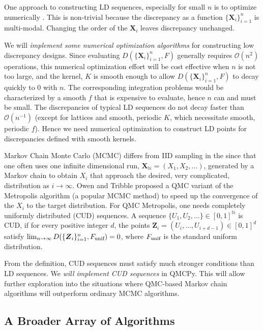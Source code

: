 \documentclass[11pt]{NSFamsart}
\newcommand{\unif}{\textup{unif}}
\newcommand{\naturals}{{\mathbb{N}}}
\newcommand{\bX}{{\boldsymbol{X}}}
\newcommand{\bZ}{{\boldsymbol{Z}}}
\newcommand{\Order}{\mathcal{O}}
\begin{document}
One approach to constructing LD sequences, especially for small $n$ is to optimize numerically \cite{WinFan97a,LiKanHic20a}.  This is non-trivial because the discrepancy as a function $\{ \bX_i\}_{i=1}^n$ is multi-modal.  Changing the order of the $\bX_i$ leaves discrepancy unchanged.  

We will \emph{implement some numerical optimization algorithms} for constructing low discrepancy designs.  Since evaluating  $D(\{ \bX_i\}_{i=1}^n,F)$ generally requires $\Order(n^2)$ operations, this numerical optimization effort will be cost effective when $n$ is not too large, and the kernel, $K$ is smooth enough to allow $D(\{ \bX_i\}_{i=1}^n,F)$  to decay quickly to $0$ with $n$.  The corresponding integration problems would be characterized by a smooth $f$ that is expensive to evaluate, hence  $n$ can and must be small.  The discrepancies of typical LD sequences do not decay faster than $\Order(n^{-1})$ (except for lattices and smooth, periodic $K$, which necessitate smooth, periodic $f$).  Hence we need numerical optimization to construct LD points  for discrepancies defined with smooth kernels.

Markov Chain Monte Carlo (MCMC) differs from IID sampling in the since that one often uses one infinite dimensional run, $\bX_{\naturals} = (X_1, X_2, \dots)$, generated by a Markov chain to obtain $X_i$ that approach the desired, very complicated, distribution as $i \to \infty$.  Owen and Tribble \cite{OweTri05a} proposed a QMC variant of the Metropolis algorithm (a popular MCMC method) to speed up the convergence of the $X_i$ to the target distribution.  For QMC Metropolis, one needs completely uniformly distributed (CUD) sequences.  A sequence $\{U_1, U_2, \ldots \} \in [0, 1]^{\naturals}$  is CUD, if for every positive integer $d$, the points $\bZ_i = (U_{i}, \ldots, U_{i+d-1}) \in [0, 1]^d$ satisfy $\lim_{n \to \infty} D(\{ \bZ_i\}_{i=1}^n,F_{\unif}) = 0$, where $F_{\unif}$  is the standard uniform distribution.

From the definition, CUD  sequences must satisfy much stronger conditions than LD sequences.  We \emph{will implement CUD sequences} in QMCPy.  This will allow further exploration into the situations where QMC-based Markov chain algorithms will outperform ordinary MCMC algorithms.


\subsection{A Broader Array of Algorithms}
\end{document}
